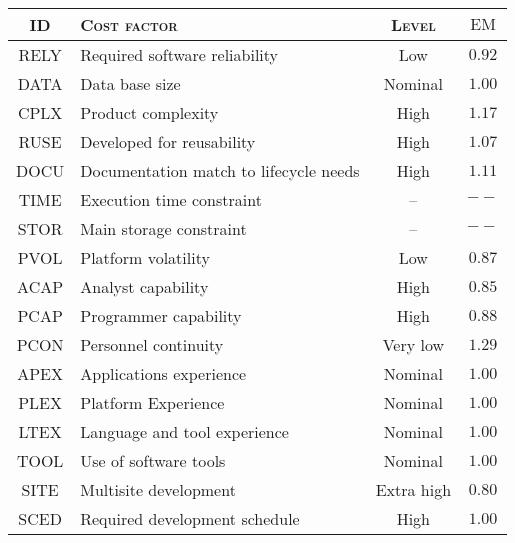\begin{table}\begin{tabularx}{\textwidth}{ >{\ttfamily}c X c c }

\toprule
\normalfont\textsc{ID} & \normalfont\textsc{Cost factor} & \normalfont\textsc{Level} & $ \text{EM} $ \\
\toprule

RELY	& Required software reliability	& Low		& $ 0.92 $ \\ \midrule
DATA	& Data base size					& Nominal	& $ 1.00 $ \\ \midrule
CPLX	& Product complexity				& High		& $ 1.17 $ \\ \midrule
RUSE	& Developed for reusability		& High		& $ 1.07 $ \\ \midrule
DOCU	& Documentation match to lifecycle needs		& High		& $ 1.11 $ \\ \midrule

TIME	& Execution time constraint		& --			& $  --  $ \\ \midrule
STOR	& Main storage constraint		& --			& $  --  $ \\ \midrule
PVOL	& Platform volatility			& Low		& $ 0.87 $ \\ \midrule

ACAP	& Analyst capability				& High		& $ 0.85 $ \\ \midrule
PCAP	& Programmer capability			& High		& $ 0.88 $ \\ \midrule
PCON	& Personnel continuity			& Very low	& $ 1.29 $ \\ \midrule
APEX	& Applications experience 		& Nominal	& $ 1.00 $ \\ \midrule
PLEX	& Platform Experience			& Nominal	& $ 1.00 $ \\ \midrule
LTEX	& Language and tool experience	& Nominal	& $ 1.00 $ \\ \midrule

TOOL	& Use of software tools			& Nominal	& $ 1.00 $ \\ \midrule
SITE	& Multisite development			& Extra high	& $ 0.80 $ \\ \midrule
SCED	& Required development schedule	& High		& $ 1.00 $ \\



\bottomrule
	
\end{tabularx}\end{table}







